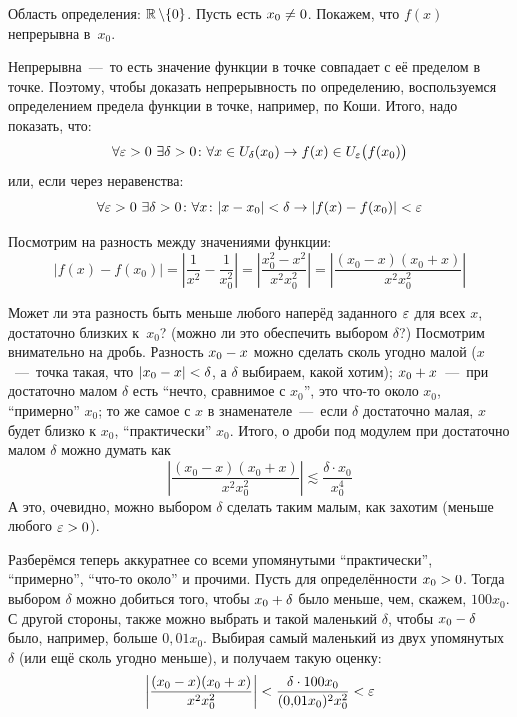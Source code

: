 \documentclass[a4paper,12pt]{article}
\begin{document}
  \begin{solution}
    Область определения: $\RR \hm\setminus \{0\}$.
    Пусть есть $x_0 \hm{\not=} 0$.
    Покажем, что $f(x)$ непрерывна в~$x_0$.
    
    Непрерывна~---~то есть значение функции в точке совпадает с её пределом в точке.
    Поэтому, чтобы доказать непрерывность по определению, воспользуемся определением предела функции в точке, например, по Коши.
    Итого, надо показать, что:
    \[
      \forall \varepsilon > 0\ \exists \delta > 0\colon \forall x \in U_{\delta}(x_0) \to f(x) \in U_{\varepsilon}\bigl(f(x_0)\bigr)
    \]
    или, если через неравенства:
    \[
      \forall \varepsilon > 0\ \exists \delta > 0\colon \forall x\colon |x - x_0| < \delta \to |f(x) - f(x_0)| < \varepsilon
    \]

    Посмотрим на разность между значениями функции:
    \[
      |f(x) - f(x_0)| = \left|\frac{1}{x^2} - \frac{1}{x_0^2}\right|
        = \left|\frac{x_0^2 - x^2}{x^2 x_0^2}\right|
        = \left|\frac{(x_0 - x)(x_0 + x)}{x^2 x_0^2}\right|
    \]

    Может ли эта разность быть меньше любого наперёд заданного $\varepsilon$ для всех $x$, достаточно близких к~$x_0$? (можно ли это обеспечить выбором $\delta$?)
    Посмотрим внимательно на дробь.
    Разность $x_0 \hm- x$ можно сделать сколь угодно малой ($x$~---~точка такая, что $|x_0 \hm- x| \hm< \delta$, а $\delta$ выбираем, какой хотим);
    $x_0 \hm+ x$~---~при достаточно малом $\delta$ есть ``нечто, сравнимое с $x_0$'', это что-то около $x_0$, ``примерно'' $x_0$;
    то же самое с $x$ в знаменателе~---~если $\delta$ достаточно малая, $x$ будет близко к $x_0$, ``практически'' $x_0$.
    Итого, о дроби под модулем при достаточно малом $\delta$ можно думать как
    \[
      \left|\frac{(x_0 - x)(x_0 + x)}{x^2 x_0^2}\right| \lesssim \frac{\delta \cdot x_0}{x_0^4}
    \]
    А это, очевидно, можно выбором $\delta$ сделать таким малым, как захотим (меньше любого $\eps \hm> 0$).

    Разберёмся теперь аккуратнее со всеми упомянутыми ``практически'', ``примерно'', ``что-то около'' и прочими.
    Пусть для определённости $x_0 \hm> 0$.
    Тогда выбором $\delta$ можно добиться того, чтобы $x_0 \hm+ \delta$ было меньше, чем, скажем, $100 x_0$.
    С другой стороны, также можно выбрать и такой маленький $\delta$, чтобы $x_0 \hm- \delta$ было, например, больше $0{,}01 x_0$.
    Выбирая самый маленький из двух упомянутых $\delta$ (или ещё сколь угодно меньше), и получаем такую оценку:
    \[
      \left|\frac{(x_0 - x)(x_0 + x)}{x^2 x_0^2}\right| < \frac{\delta \cdot 100 x_0}{(0{,}01 x_0)^2 x_0^2} < \varepsilon
    \]


\end{solution}
\end{document}
